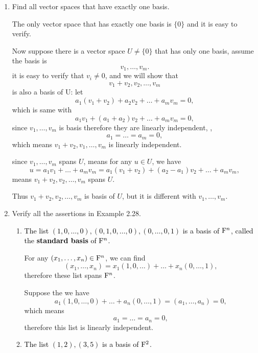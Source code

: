 \begin{enumerate}
    \item Find all vector spaces that have exactly one basis.
        \begin{solution}
            The only vector space that has exactly one basis is $\{0\}$ and it is easy to verify. 

            Now suppose there is a vector space $U \neq \{0\}$ that has only one basis, assume the basis is 
            \[ v_1, \ldots, v_m .\]
            it is easy to verify that $v_i \neq 0$, 
            and we will show that 
            \[ v_1 + v_2, v_2, \ldots, v_m\] 
            is also a basis of U:
            let 
            \[ a_1 (v_1+v_2) + a_2v_2 + \dots + a_mv_m = 0,\]
            which is same with 
            \[ a_1v_1 + (a_1+a_2)v_2 + \dots + a_mv_m = 0,\]
            since $v_1, \ldots, v_m$ is basis therefore they are linearly independent, \ie, 
            \[ a_1 = \dots = a_m = 0,\]
            which means $v_1+v_2, v_1, \ldots, v_m$ is linearly independent.

            since $v_1, \ldots, v_m$ spans $U$, means for any $u \in U$, we have 
            \[ u = a_1v_1 + \dots + a_mv_m = a_1(v_1+v_2) + (a_2-a_1)v_2 + \dots + a_mv_m,\]
            means $v_1+v_2, v_2, \ldots, v_m$ spans $U$.

            Thus $v_1+v_2, v_2, \ldots, v_m$ is basis of $U$, but it is different with $v_1, \ldots, v_m$.
        \end{solution}
    \item Verify all the assertions in Example 2.28.
        \begin{solution}
            \begin{enumerate}[label=(\alph*)]
                \item \textcolor{black}{The list $(1,0,\ldots,0),(0,1,0,\ldots,0),(0,\ldots,0,1)$ is a basis of $\mathrm{F}^n$, called the \textbf{standard basis} of $\mathrm{F}^n$.}
                
                    For any $(x_1,\ldots, x_n) \in \mathrm{F}^n$, we can find 
                    \[ (x_1, \ldots, x_n) = x_1(1,0,\ldots) + \dots + x_n(0,\ldots,1),\]
                    therefore these list spans $\mathrm{F}^n$.

                    Suppose the we have 
                    \[ a_1 (1,0,\ldots,0) + \dots + a_n(0,\ldots,1) = (a_1, \ldots, a_n) = 0,\]
                    which means 
                    \[ a_1 = \ldots = a_n = 0,\]
                    therefore this list is linearly independent.
                \item \textcolor{black}{The list $(1,2),(3,5)$ is a basis of $\mathrm{F}^2$.}
                

\end{enumerate}
\end{solution}
\end{enumerate}
